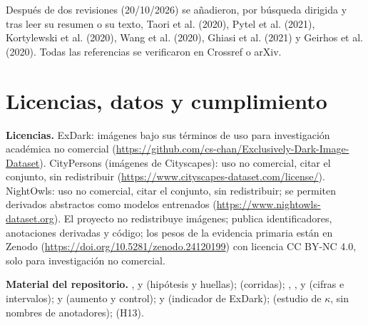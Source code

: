 \documentclass[10pt]{article}
\begin{document}
\noindent  Después de dos revisiones (20/10/2026) se añadieron, por búsqueda dirigida y tras leer su resumen o su texto, Taori et al. (2020), Pytel et al. (2021), Kortylewski et al. (2020), Wang et al. (2020), Ghiasi et al. (2021) y Geirhos et al. (2020). Todas las referencias se verificaron en Crossref o arXiv.

\section{Licencias, datos y cumplimiento}
\noindent\textbf{Licencias.} ExDark: imágenes bajo sus términos de uso para investigación académica no comercial (\url{https://github.com/cs-chan/Exclusively-Dark-Image-Dataset}). CityPersons (imágenes de Cityscapes): uso no comercial, citar el conjunto, sin redistribuir (\url{https://www.cityscapes-dataset.com/license/}). NightOwls: uso no comercial, citar el conjunto, sin redistribuir; se permiten derivados abstractos como modelos entrenados (\url{https://www.nightowls-dataset.org}). El proyecto no redistribuye imágenes; publica identificadores, anotaciones derivadas y código; los pesos de la evidencia primaria están en Zenodo (\url{https://doi.org/10.5281/zenodo.24120199}) con licencia CC BY-NC 4.0, solo para investigación no comercial.

\noindent\textbf{Material del repositorio.} ,  y  (hipótesis y huellas);  (corridas); , ,  y  (cifras e intervalos);  y  (aumento y control);  y  (indicador de ExDark);  (estudio de $\kappa$, sin nombres de anotadores);  (H13).
\end{document}
